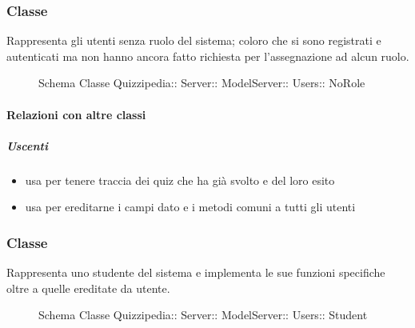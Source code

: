 \subsubsection{Classe }
Rappresenta gli utenti senza ruolo del sistema; coloro che si sono registrati e autenticati ma non hanno ancora fatto richiesta per l'assegnazione ad alcun ruolo.
\begin{figure}[H]
\centering
\noindent{}
\caption[Schema Classe NoRole]{Schema Classe Quizzipedia:: Server:: ModelServer:: Users:: NoRole}
\end{figure}
\paragraph{Relazioni con altre classi}
\subparagraph{Uscenti}
\begin{itemize}
\item usa  per tenere traccia dei quiz che ha già svolto e del loro esito
\item usa  per ereditarne i campi dato e i metodi comuni a tutti gli utenti
\end{itemize}
\subsubsection{Classe }
Rappresenta uno studente del sistema e implementa le sue funzioni specifiche oltre a quelle ereditate da utente.
\begin{figure}[H]
\centering
\noindent{}
\caption[Schema Classe Student]{Schema Classe Quizzipedia:: Server:: ModelServer:: Users:: Student}
\end{figure}
